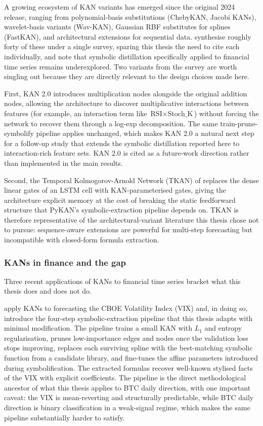 \documentclass[12pt,a4paper,oneside]{article}
\begin{document}
A growing ecosystem of KAN variants has emerged since the original 2024 release, ranging from polynomial-basis substitutions (ChebyKAN, Jacobi KANs), wavelet-basis variants (Wav-KAN), Gaussian RBF substitutes for splines (FastKAN), and architectural extensions for sequential data. \citet{yamak_et_al_2025} synthesise roughly forty of these under a single survey, sparing this thesis the need to cite each individually, and note that symbolic distillation specifically applied to financial time series remains underexplored. Two variants from the survey are worth singling out because they are directly relevant to the design choices made here.

First, KAN 2.0 \citep{liu_kan2_2024} introduces multiplication nodes alongside the original addition nodes, allowing the architecture to discover multiplicative interactions between features (for example, an interaction term like $\text{RSI} \times \text{Stoch\_K}$) without forcing the network to recover them through a log-exp decomposition. The same train-prune-symbolify pipeline applies unchanged, which makes KAN 2.0 a natural next step for a follow-up study that extends the symbolic distillation reported here to interaction-rich feature sets. KAN 2.0 is cited as a future-work direction rather than implemented in the main results.

Second, the Temporal Kolmogorov-Arnold Network (TKAN) of \citet{genet_inzirillo_2024} replaces the dense linear gates of an LSTM cell with KAN-parameterised gates, giving the architecture explicit memory at the cost of breaking the static feedforward structure that PyKAN's symbolic-extraction pipeline depends on. TKAN is therefore representative of the architectural-variant literature this thesis chose not to pursue: sequence-aware extensions are powerful for multi-step forecasting but incompatible with closed-form formula extraction.


\subsubsection{KANs in finance and the gap}\label{subsubsec:kan_finance}

Three recent applications of KANs to financial time series bracket what this thesis does and does not do.

\citet{cho_lee_kim_2025} apply KANs to forecasting the CBOE Volatility Index (VIX) and, in doing so, introduce the four-step symbolic-extraction pipeline that this thesis adapts with minimal modification. The pipeline trains a small KAN with $L_1$ and entropy regularisation, prunes low-importance edges and nodes once the validation loss stops improving, replaces each surviving spline with the best-matching symbolic function from a candidate library, and fine-tunes the affine parameters introduced during symbolification. The extracted formulas recover well-known stylised facts of the VIX with explicit coefficients. The pipeline is the direct methodological ancestor of what this thesis applies to BTC daily direction, with one important caveat: the VIX is mean-reverting and structurally predictable, while BTC daily direction is binary classification in a weak-signal regime, which makes the same pipeline substantially harder to satisfy.
\end{document}
